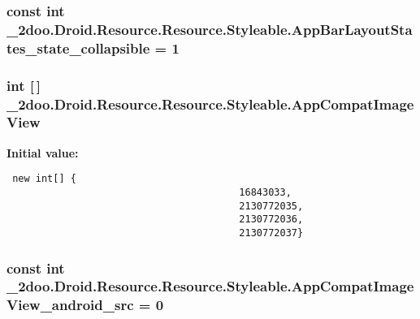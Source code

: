 \hypertarget{class__2doo_1_1_droid_1_1_resource_1_1_styleable_453ddf898de27d39580edf02da6c4994}{
\subsubsection[{AppBarLayoutStates\_\-state\_\-collapsible}]{\setlength{\rightskip}{0pt plus 5cm}const int \_\-2doo.Droid.Resource.Resource.Styleable.AppBarLayoutStates\_\-state\_\-collapsible = 1}}
\label{class__2doo_1_1_droid_1_1_resource_1_1_styleable_453ddf898de27d39580edf02da6c4994}


\hypertarget{class__2doo_1_1_droid_1_1_resource_1_1_styleable_8accdf58dd9cdb4860801d5ff3720f5c}{
\subsubsection[{AppCompatImageView}]{\setlength{\rightskip}{0pt plus 5cm}int \mbox{[}$\,$\mbox{]} \_\-2doo.Droid.Resource.Resource.Styleable.AppCompatImageView}}
\label{class__2doo_1_1_droid_1_1_resource_1_1_styleable_8accdf58dd9cdb4860801d5ff3720f5c}


\textbf{Initial value:}

\begin{Code}\begin{verbatim} new int[] {
                                        16843033,
                                        2130772035,
                                        2130772036,
                                        2130772037}
\end{verbatim}
\end{Code}
\hypertarget{class__2doo_1_1_droid_1_1_resource_1_1_styleable_beee12b0d0961fcbf5bbbd0c4f27604b}{
\subsubsection[{AppCompatImageView\_\-android\_\-src}]{\setlength{\rightskip}{0pt plus 5cm}const int \_\-2doo.Droid.Resource.Resource.Styleable.AppCompatImageView\_\-android\_\-src = 0}}
\label{class__2doo_1_1_droid_1_1_resource_1_1_styleable_beee12b0d0961fcbf5bbbd0c4f27604b}


